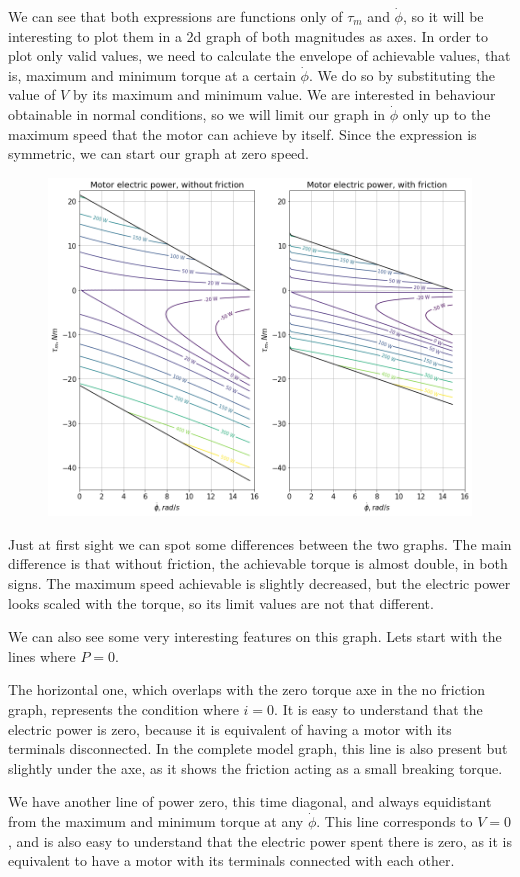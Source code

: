 \documentclass[12pt]{article}
\begin{document}
We can see that both expressions are functions only of $\tau_{m}$ and $\dot{\phi}$, so it will be interesting to plot them in a 2d graph of both magnitudes as axes. In order to plot only valid values, we need to calculate the envelope of achievable values, that is, maximum and minimum torque at a certain  $\dot{\phi}$. We do so by substituting the value of $V$ by its maximum and minimum value. We are interested in behaviour obtainable in normal conditions, so we will limit our graph in $\dot{\phi}$ only up to the maximum speed that the motor can achieve by itself. Since the expression is symmetric, we can start our graph at zero speed.
\begin{figure}[h]
	\centering
	\includegraphics[width=.5\linewidth]{motor_electric_power_w_and_wout_fricc}
	\label{fig:power_f_tau_speed}
\end{figure}

Just at first sight we can spot some differences between the two graphs. The main difference is that without friction, the achievable torque is almost double, in both signs. The maximum speed achievable is slightly decreased, but the electric power looks scaled with the torque, so its limit values are not that different.

We can also see some very interesting features on this graph. Lets start with the lines where $P = 0$. 

The horizontal one, which overlaps with the zero torque axe in the no friction graph, represents the condition where $i = 0$. It is easy to understand that the electric power is zero, because it is equivalent of having a motor with its terminals disconnected. In the complete model graph, this line is also present but slightly under the axe, as it shows the friction acting as a small breaking torque.

We have another line of power zero, this time diagonal, and always equidistant from the maximum and minimum torque at any $\dot{\phi}$. This line corresponds to $V = 0$, and is also easy to understand that the electric power spent there is zero, as it is equivalent to have a motor with its terminals connected with each other.
\end{document}
